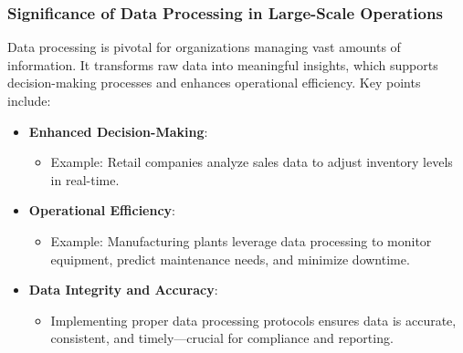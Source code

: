 \documentclass[aspectratio=169]{beamer}
\begin{document}
\begin{frame}[fragile]
    \frametitle{Significance of Data Processing in Large-Scale Operations}
    Data processing is pivotal for organizations managing vast amounts of information. It transforms raw data into meaningful insights, which supports decision-making processes and enhances operational efficiency. Key points include:
    \begin{itemize}
        \item \textbf{Enhanced Decision-Making}:
        \begin{itemize}
            \item Example: Retail companies analyze sales data to adjust inventory levels in real-time.
        \end{itemize}
        
        \item \textbf{Operational Efficiency}:
        \begin{itemize}
            \item Example: Manufacturing plants leverage data processing to monitor equipment, predict maintenance needs, and minimize downtime.
        \end{itemize}
        
        \item \textbf{Data Integrity and Accuracy}:
        \begin{itemize}
            \item Implementing proper data processing protocols ensures data is accurate, consistent, and timely—crucial for compliance and reporting.
        \end{itemize}
    \end{itemize}
\end{frame}
\end{document}
